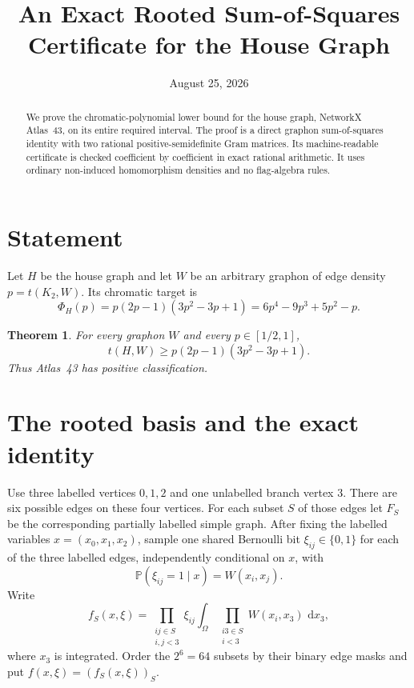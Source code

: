 \documentclass[11pt]{article}
\title{An Exact Rooted Sum-of-Squares Certificate for the House Graph}
\author{}
\date{August 25, 2026}
\newtheorem{theorem}{Theorem}
\newcommand{\dd}{\,\mathrm d}
\begin{document}
\maketitle

\begin{abstract}
We prove the chromatic-polynomial lower bound for the house graph, NetworkX
Atlas~43, on its entire required interval.  The proof is a direct graphon
sum-of-squares identity with two rational positive-semidefinite Gram
matrices.  Its machine-readable certificate is checked coefficient by
coefficient in exact rational arithmetic.  It uses ordinary non-induced
homomorphism densities and no flag-algebra rules.
\end{abstract}

\section{Statement}

Let $H$ be the house graph and let $W$ be an arbitrary graphon of edge
density $p=t(K_2,W)$.  Its chromatic target is
\[
 \Phi_H(p)=p(2p-1)(3p^2-3p+1)
 =6p^4-9p^3+5p^2-p.
\]

\begin{theorem}\label{thm:house}
For every graphon $W$ and every $p\in[1/2,1]$,
\[
 t(H,W)\geq p(2p-1)(3p^2-3p+1).
\]
Thus Atlas~43 has positive classification.
\end{theorem}

\section{The rooted basis and the exact identity}

Use three labelled vertices $0,1,2$ and one unlabelled branch vertex $3$.
There are six possible edges on these four vertices.  For each subset $S$
of those edges let $F_S$ be the corresponding partially labelled simple
graph.  After fixing the labelled variables $x=(x_0,x_1,x_2)$, sample one
shared Bernoulli bit $\xi_{ij}\in\{0,1\}$ for each of the three labelled
edges, independently conditional on $x$, with
\[
 \mathbb P(\xi_{ij}=1\mid x)=W(x_i,x_j).
\]
Write
\[
 f_S(x,\xi)=
 \prod_{\substack{ij\in S\\i,j<3}}\xi_{ij}
 \int_\Omega
 \prod_{\substack{i3\in S\\i<3}}W(x_i,x_3)\,\dd x_3,
\]
where $x_3$ is integrated.  Order the $2^6=64$ subsets by their binary edge
masks and put $f(x,\xi)=(f_S(x,\xi))_S$.
\end{document}
